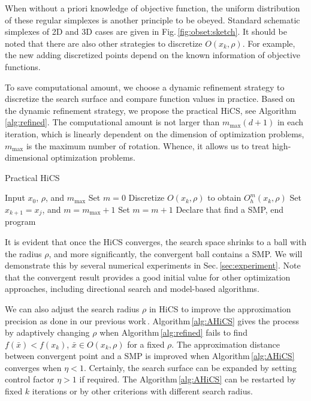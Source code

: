 \documentclass[mathpazo]{csam}
\theoremstyle{remark}
\begin{document}
When without a priori knowledge of objective function, the
uniform distribution of these regular simplexes is another
principle to be obeyed.
Standard schematic simplexes of 2D and
3D cases are given in Fig.\,\ref{fig:obset:sketch}.
It should be noted that there are also other strategies to
discretize $O(x_k,\rho)$. 
For example, the new adding discretized points 
depend on the known information of objective functions. 

To save computational amount, we choose a dynamic refinement
strategy to discretize the search surface and compare function
values in practice. 
Based on the dynamic refinement strategy, we propose the
practical HiCS, see Algorithm \ref{alg:refined}. The computational amount is not
larger than $m_{\max}(d+1)$ in each iteration, which is linearly
dependent on the dimension of optimization problems,
$m_{\max}$ is the maximum number of rotation.
Whence, it allows us to treat high-dimensional optimization problems.

\begin{algorithm}[H]
	\caption{Practical HiCS}
	\label{alg:refined}
\begin{algorithmic}[1]
	\STATE Input $x_0$, $\rho$, and $m_{\max}$
		\STATE Set $m=0$
			\STATE Discretize $O(x_k,\rho)$ to obtain $O^m_h(x_k,\rho)$
				\STATE Set $x_{k+1}=x_j$, and $m=m_{\max}+1$
			\ELSE
				\STATE Set $m = m+1$
			\ENDIF
		\ELSE
			\STATE Declare that find a SMP, end program
		\ENDIF
	\ENDFOR
\end{algorithmic}
\end{algorithm}

It is evident that once the HiCS converges,
the search space shrinks to a ball with the radius $\rho$, and
more significantly, the convergent ball contains a SMP.
We will demonstrate this by several numerical experiments in
Sec.\,\ref{sec:experiment}.
Note that the convergent result provides a
good initial value for other optimization approaches, including 
directional search and model-based algorithms.

We can also adjust the search radius $\rho$ in HiCS 
to improve the approximation precision as done in our previous
work\,\cite{huang2017hill}. Algorithm\,\ref{alg:AHiCS} gives the
process by adaptively changing $\rho$ when Algorithm\,\ref{alg:refined} fails
to find $f(\bar{x})<f(x_k)$, $\bar{x}\in O(x_k, \rho)$ for a fixed $\rho$.
The approximation distance between convergent point and a SMP is
improved when Algorithm\,\ref{alg:AHiCS} converges when $\eta <1$.
Certainly, the search surface can be expanded by setting
control factor $\eta>1$ if required. 
The Algorithm\,\ref{alg:AHiCS} can be restarted by
fixed $k$ iterations or by other criterions
with different search radius.
\end{document}
